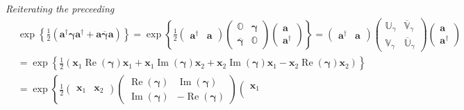 \documentclass[aps, preprint]{revtex4}
\begin{document}
\emph{Reiterating the preceeding}
\begin{align} & \exp  \left \{\frac{1}{2} \left (\mathbf{a}^{ \dag } \mathbf{\gamma } \mathbf{a}^{ \dag } +\mathbf{a} \overline{\mathbf{\gamma }} \mathbf{a}\right )\right \} =\exp  \left \{\frac{1}{2} \left (\begin{array}{cc}\mathbf{a}^{ \dag } & \mathbf{a}\end{array}\right ) \left (\begin{array}{cc}\mathbb{O} & \mathbf{\gamma } \\
\overline{\mathbf{\gamma }} & \mathbb{O}\end{array}\right ) \left (\begin{array}{c}\mathbf{a} \\
\mathbf{a}^{ \dag }\end{array}\right )\right \} =\left (\begin{array}{cc}\mathbf{a}^{ \dag } & \mathbf{a}\end{array}\right ) \left (\begin{array}{cc}\mathbb{U}_{\gamma } & \overline{\mathbb{V}}_{\gamma } \\
\mathbb{V}_{\gamma } & \overline{\mathbb{U}}_{\gamma }\end{array}\right ) \left (\begin{array}{c}\mathbf{a} \\
\mathbf{a}^{ \dag }\end{array}\right ) \\
 &  =\exp  \left \{\frac{1}{2} \left (\mathbf{x}_{1} \ensuremath{\operatorname*{Re}} \left (\mathbf{\gamma }\right ) \mathbf{x}_{1} +\mathbf{x}_{1} \ensuremath{\operatorname*{Im}} \left (\mathbf{\gamma }\right ) \mathbf{x}_{2} +\mathbf{x}_{2} \ensuremath{\operatorname*{Im}} \left (\mathbf{\gamma }\right ) \mathbf{x}_{1} -\mathbf{x}_{2} \ensuremath{\operatorname*{Re}} \left (\mathbf{\gamma }\right ) \mathbf{x}_{2}\right )\right \} \\
 &  =\exp  \left \{\frac{1}{2} \left (\begin{array}{cc}\mathbf{x}_{1} & \mathbf{x}_{2}\end{array}\right ) \left (\begin{array}{cc}\ensuremath{\operatorname*{Re}} \left (\mathbf{\gamma }\right ) & \ensuremath{\operatorname*{Im}} \left (\mathbf{\gamma }\right ) \\
\ensuremath{\operatorname*{Im}} \left (\mathbf{\gamma }\right ) &  -\ensuremath{\operatorname*{Re}} \left (\mathbf{\gamma }\right )\end{array}\right ) \left (\begin{array}{c}\mathbf{x}_{1} \\

\end{array}
\end{align}
\end{document}
